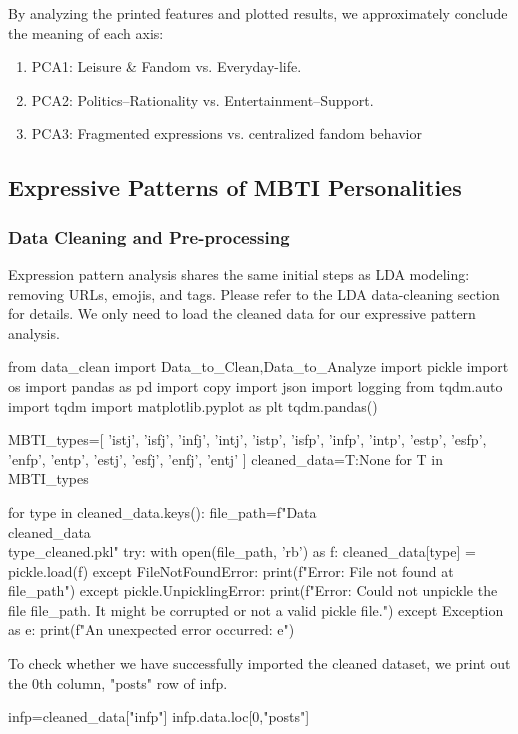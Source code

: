\documentclass[12pt]{article}
\begin{document}
	By analyzing the printed features and plotted results, we approximately conclude the meaning of each axis:
	\begin{enumerate}
	\item PCA1: Leisure \& Fandom vs. Everyday-life.
	\item PCA2: Politics–Rationality vs. Entertainment–Support.
	\item PCA3: Fragmented expressions vs. centralized fandom behavior
	\end{enumerate}
	
	
	
	
	
	
	\subsection{Expressive Patterns of MBTI Personalities}
	\subsubsection{Data Cleaning and Pre-processing}
	Expression pattern analysis shares the same initial steps as LDA modeling: removing URLs, emojis, and tags. Please refer to the LDA data-cleaning section for details. We only need to load the cleaned data for our expressive pattern analysis.
	\begin{python}
from data_clean import Data_to_Clean,Data_to_Analyze
import pickle
import os
import pandas as pd
import copy
import json
import logging
from tqdm.auto import tqdm
import matplotlib.pyplot as plt
tqdm.pandas()

MBTI_types=[
    'istj', 'isfj', 'infj', 'intj', 
    'istp', 'isfp', 'infp', 'intp', 
    'estp', 'esfp', 'enfp', 'entp', 
    'estj', 'esfj', 'enfj', 'entj'
    ]
cleaned_data={T:None for T in MBTI_types}

for type in cleaned_data.keys():
    file_path=f"Data\\cleaned_data\\{type}_cleaned.pkl" 
    try:
        with open(file_path, 'rb') as f:
            cleaned_data[type] = pickle.load(f)
    except FileNotFoundError:
        print(f"Error: File not found at {file_path}")
    except pickle.UnpicklingError:
        print(f"Error: Could not unpickle the file {file_path}. It might be corrupted or not a valid pickle file.")
    except Exception as e:
        print(f"An unexpected error occurred: {e}")
	\end{python}
	
	To check whether we have successfully imported the cleaned dataset, we print out the 0th column,  "posts" row of infp.
	\begin{python}
infp=cleaned_data["infp"]
infp.data.loc[0,"posts"]
	\end{python}
	
\end{document}
